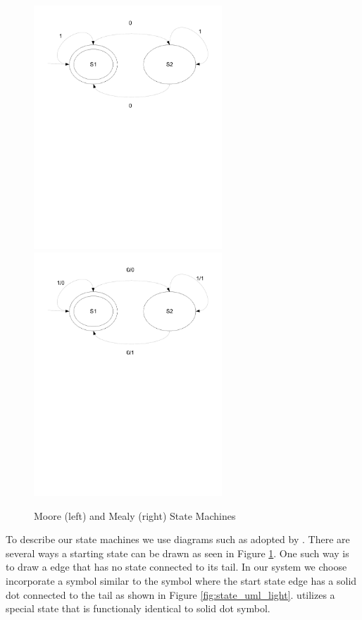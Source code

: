 \begin{figure}[htp]
    \centering
    \includegraphics[trim= 15mm 150mm 15mm 10mm, clip, width=200pt]{./images/state_moore.pdf} 
    \includegraphics[trim= 15mm 150mm 15mm 10mm, clip, width=200pt]{./images/state_mealy.pdf}    
    \caption{Moore (left) and Mealy (right) State Machines}
    \label{fig:state_moore_mealy}
\end{figure}

To describe our state machines we use diagrams such as adopted by \cite{UML2}. There are several ways a starting state can be drawn as seen in Figure \ref{fig:state_moore_mealy}.
One such way is to draw a edge that has no state connected to its tail. In our system we choose incorporate a symbol similar to  the \cite{UML2} symbol where the start state edge has a solid dot connected to the tail as shown in Figure \ref{fig:state_uml_light}. {\plccharts} utilizes a special  state that is functionaly identical to  solid dot symbol.

